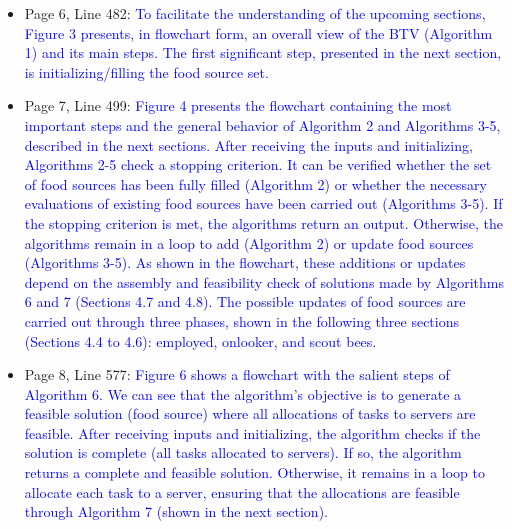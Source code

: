 \begin{itemize}
    \item Page 6, Line 482: \textcolor{blue}{To facilitate the understanding of the upcoming sections, Figure 3 presents, in flowchart form, an overall view of the BTV (Algorithm 1) and its main steps. The first significant step, presented in the next section, is initializing/filling the food source set.}
    \item Page 7, Line 499: \textcolor{blue}{Figure 4 presents the flowchart containing the most important steps and the general behavior of Algorithm 2 and Algorithms 3-5, described in the next sections. After receiving the inputs and initializing, Algorithms 2-5 check a stopping criterion. It can be verified whether the set of food sources has been fully filled (Algorithm 2) or whether the necessary evaluations of existing food sources have been carried out (Algorithms 3-5). If the stopping criterion is met, the algorithms return an output. Otherwise, the algorithms remain in a loop to add (Algorithm 2) or update food sources (Algorithms 3-5). As shown in the flowchart, these additions or updates depend on the assembly and feasibility check of solutions made by Algorithms 6 and 7 (Sections 4.7 and 4.8). The possible updates of food sources are carried out through three phases, shown in the following three sections (Sections 4.4 to 4.6): employed, onlooker, and scout bees.}
    \item Page 8, Line 577: \textcolor{blue}{Figure 6 shows a flowchart with the salient steps of Algorithm 6. We can see that the algorithm's objective is to generate a feasible solution (food source) where all allocations of tasks to servers are feasible. After receiving inputs and initializing, the algorithm checks if the solution is complete (all tasks allocated to servers). If so, the algorithm returns a complete and feasible solution. Otherwise, it remains in a loop to allocate each task to a server, ensuring that the allocations are feasible through Algorithm 7 (shown in the next section).}
\end{itemize}